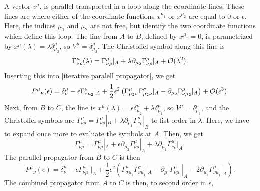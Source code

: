%
A vector $v^\mu$, is parallel transported in a loop along the coordinate lines.
These lines are where either of the coordinate functions $x^{\mu_1}$ or $x^{\mu_2}$ are equal to $0$ or $\epsilon$.
Here, the indices $\mu_1$ and $\mu_2$ are not free, but identify the two coordinate functions which define this loop.
The line from $A$ to $B$, defined by $x^{\mu_1} = 0$, is parametrized by $x^\mu(\lambda) = \lambda \delta^\mu_{\mu_2}$, so $ V^\mu = \delta^\mu_{\mu_2} $.
The Christoffel symbol along this line is
%
\begin{equation}
    \Gamma^{\mu}_{\nu \rho}(\lambda) 
    = \Gamma^{\mu}_{\nu \rho}|_A
    + \lambda \partial_{\mu_2} \Gamma^{\mu}_{\nu \rho}|_A + \mathcal O(\lambda^2).
\end{equation}
%
Inserting this into \autoref{iterative paralell propagator}, we get
%
\begin{equation}
    P^\mu{}_\nu(\epsilon)
    = \delta^\mu_\nu 
    - \epsilon \Gamma^{\mu}_{\nu \mu_2}|_A
    + \frac{1}{2} \epsilon^2 
    \left(
        \Gamma^\mu_{\mu_2 \sigma}\Gamma^\sigma_{\mu_2 \nu} |_A 
        -\partial_{\mu_2} \Gamma^{\mu}_{\nu \mu_2}|_A 
    \right)
    + \mathcal O(\epsilon^3).
\end{equation}
%
Next, from $B$ to $C$, the line is $x^\mu(\lambda) = \epsilon \delta^\mu_{\mu_2} + \lambda \delta^{\mu}_{\mu_1}$, so $V^\mu = \delta^\mu_{\mu_1}$, and the Christoffel symbols are 
$ 
\Gamma^{\mu}_{\nu\rho}
= 
\Gamma^{\mu}_{\nu \rho}|_B
+ \lambda \partial_{\mu_1} \Gamma^{\mu}_{\nu \rho}|_B
$
to fist order in $\lambda$.
Here, we have to expand once more to evaluate the symbols at $A$.
Then, we get
%
\begin{equation}
    \Gamma^{\mu}_{\nu\rho}
    =
    \Gamma^{\mu}_{\nu \rho}|_A + \epsilon \partial_{\mu_2} \Gamma^{\mu}_{\nu \rho}|_A
    + \lambda \partial_{\mu_1} \Gamma^{\mu}_{\nu \rho}|_A,
\end{equation}
%
The parallel propagator from $B$ to $C$ is then
%
\begin{equation}
    P^{\mu}{}_\nu(\epsilon)
    = 
    \delta^\mu_\nu
    - \epsilon \Gamma^{\mu}_{\nu \mu_1}|_A 
    + \frac{1}{2}\epsilon^2
    \left(
        \Gamma^\mu_{\sigma \mu_1}\Gamma^\sigma_{\nu \mu_1}|_A
        - \partial_{\mu_1} \Gamma^{\mu}_{\nu \mu_1}|_A
        - 2 \partial_{\mu_2} \Gamma^{\mu}_{\nu \mu_1}|_A
    \right).
\end{equation}
%
The combined propagator from $A$ to $C$ is then, to second order in $\epsilon$, 
%
